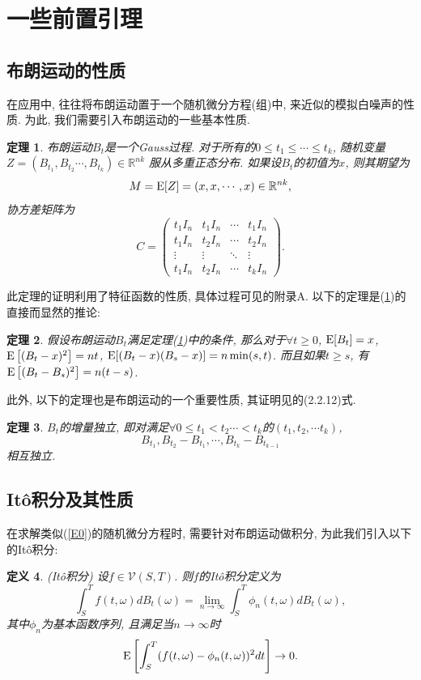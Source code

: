 \documentclass[notitlepage,cs4size,punct,oneside]{ctexrep}
\numberwithin{equation}{section}
\theoremstyle{mystyle}
\newtheorem{definition}{\hspace{2em}定义}[section]
\newtheorem{theorem}[definition]{\hspace{2em}定理}
\begin{document}
\section{一些前置引理}
\subsection{布朗运动的性质}
在应用中, 往往将布朗运动置于一个随机微分方程(组)中, 来近似的模拟白噪声的性质\cite{hida1980brownian}. 
为此, 我们需要引入布朗运动的一些基本性质.\cite{oksendal2003stochastic}\cite{nelson1967dynamical}
\begin{theorem} \label{brownian1}
布朗运动$B_t$是一个Gauss过程. 对于所有的$0 \leqslant t_1 \leqslant\cdots\leqslant t_k$, 随机变量$Z = (B_{t_1}, B_{t_2}\cdots ,B_{t_k})\in \mathbb{R}^{nk}$ 服从多重正态分布. 如果设$B_t$的初值为$x$, 则其期望为 
$$M = \text{E}[Z] = (x, x, \cdots, x) \in \mathbb{R}^{nk},$$
协方差矩阵为
$$C = \left(\begin{matrix}
			t_1I_n & t_1I_n & \cdots & t_1I_n \\
			t_1I_n & t_2I_n & \cdots & t_2I_n \\
			\vdots & \vdots & \ddots & \vdots \\
			t_1I_n & t_2I_n & \cdots & t_kI_n 
			\end{matrix}
			\right).$$
\end{theorem}

此定理的证明利用了特征函数的性质, 具体过程可见\cite{oksendal2003stochastic}的附录A. 以下的定理是(\ref{brownian1})的直接而显然的推论:
\begin{theorem}
假设布朗运动$B_t$满足定理(\ref{brownian1})中的条件, 那么对于$\forall t\geqslant 0$, $\text{E}[B_t] = x$, $\text{E}\left[(B_t - x)^2\right] = nt$, $\text{E}[(B_t - x)(B_s - x)] = n\min(s, t)$. 而且如果$t \geqslant s$, 有$\text{E}\left[(B_t - B_s)^2\right] = n(t-s)$.
\end{theorem}

此外, 以下的定理也是布朗运动的一个重要性质, 其证明见\cite{oksendal2003stochastic}的(2.2.12)式.
\begin{theorem}
$B_t$的增量独立, 即对满足$\forall 0 \leqslant t_1 < t_2 \cdots < t_k$的$(t_1, t_2, \cdots t_k)$,
$$B_{t_1}, B_{t_2}-B_{t_1}, \cdots, B_{t_k}-B_{t_{k-1}}$$相互独立.
\end{theorem}

\subsection{It\^{o}积分及其性质}
在求解类似(\ref{E0})的随机微分方程时, 需要针对布朗运动做积分, 为此我们引入以下的It\^{o}积分\cite{oksendal2003stochastic}\cite{lawler2006introduction}:
\begin{definition}(It\^{o}积分)	设$f\in\mathcal{V}(S, T)$. 则$f$的It\^{o}积分定义为
$$\int_S^T f(t, \omega)dB_t(\omega) = \lim_{n\to\infty}\int_S^T\phi_n(t, \omega)dB_t(\omega),$$
其中${\phi_n}$为基本函数序列, 且满足当$n \to \infty$时
$$\text{E}\left[\int_S^T (f(t, \omega)-\phi_n(t, \omega))^2dt\right] \to 0.$$
\end{definition}
\end{document}

